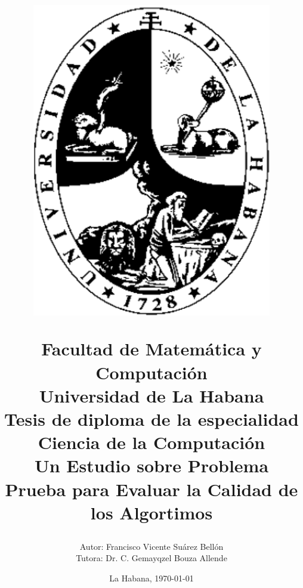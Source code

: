 \begin{titlepage}
	
	\title{\vspace*{-70pt}
		\begin{figure}
			\includegraphics[scale=0.2]{img/logo.png}
		\end{figure} 
		\vspace*{10pt}Facultad de Matemática y Computación \\
		Universidad de La Habana \\
		\vspace*{20pt}	
		Tesis de diploma de la especialidad \\ 
		Ciencia de la Computación \\
		
		\vspace*{20pt}
		Un Estudio sobre
		Problema Prueba para Evaluar la Calidad de los Algortimos %
		\vspace*{-35pt}
		\author{{\large Autor: Francisco Vicente Suárez Bellón \vspace*{15pt}} \\
			{\large Tutora: Dr. C. Gemayqzel Bouza Allende} \\ \hspace{10pt}  }
		
		\date{La Habana, \today}
	}
	
\end{titlepage}